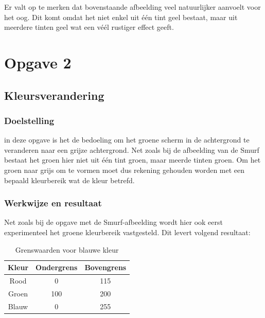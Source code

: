 			\par Er valt op te merken dat bovenstaande afbeelding veel natuurlijker aanvoelt voor het oog. Dit komt omdat het niet enkel uit \'e\'en tint geel bestaat,
			maar uit meerdere tinten geel wat een v\'e\'el rustiger effect geeft.
			
		

\section{Opgave 2}
	\subsection{Kleursverandering}

	\subsubsection{Doelstelling}
	
		\par in deze opgave is het de bedoeling om het groene scherm in de achtergrond te veranderen naar een grijze achtergrond. Net zoals bij de afbeelding van de Smurf
		bestaat het groen hier niet uit \'e\'en tint groen, maar meerde tinten groen. Om het groen naar grijs om te vormen moet dus rekening gehouden
		worden met een bepaald kleurbereik wat de kleur betrefd. \noindent
	
	\subsubsection{Werkwijze en resultaat}
	
		\par Net zoals bij de opgave met de Smurf-afbeelding wordt hier ook eerst experimenteel het groene kleurbereik vastgesteld. Dit levert volgend resultaat:
		\noindent
				\begin{table}[H]
				\centering
				\begin{tabular}{ccc}
				\hline
				Kleur & Ondergrens & Bovengrens \\ \hline
				Rood  & 0          & 115        \\
				Groen & 100        & 200        \\
				Blauw & 0          & 255        \\ \hline			
				\end{tabular}
				\caption{Grenswaarden voor blauwe kleur}
				\end{table}
				
